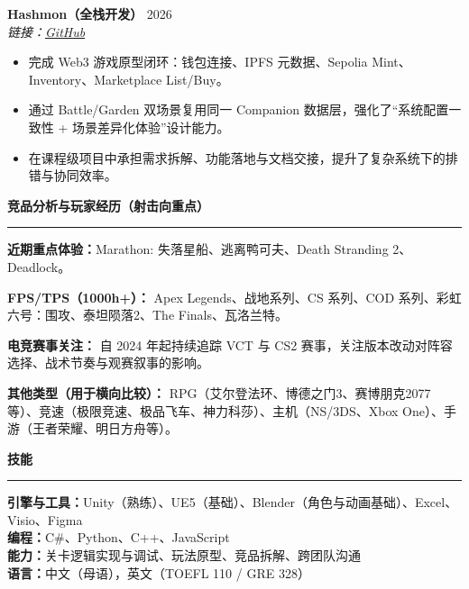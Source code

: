 \documentclass[11pt,a4paper]{ctexart}
\newcommand{\head}[1]{\vspace{2pt}\textbf{\large #1}\vspace{2pt}\hrule\vspace{4pt}}
\begin{document}
\textbf{Hashmon（全栈开发）} \hfill 2026\\
\textit{链接：\href{https://github.com/Hidden61ade/Hashmon}{GitHub}}\\
\begin{itemize}[leftmargin=1.3em,itemsep=2pt,topsep=2pt]
  \item 完成 Web3 游戏原型闭环：钱包连接、IPFS 元数据、Sepolia Mint、Inventory、Marketplace List/Buy。
  \item 通过 Battle/Garden 双场景复用同一 Companion 数据层，强化了“系统配置一致性 + 场景差异化体验”设计能力。
  \item 在课程级项目中承担需求拆解、功能落地与文档交接，提升了复杂系统下的排错与协同效率。
\end{itemize}

\head{竞品分析与玩家经历（射击向重点）}
\textbf{近期重点体验：}Marathon: 失落星船、逃离鸭可夫、Death Stranding 2、Deadlock。

\textbf{FPS/TPS（1000h+）：}
Apex Legends、战地系列、CS 系列、COD 系列、彩虹六号：围攻、泰坦陨落2、The Finals、瓦洛兰特。

\textbf{电竞赛事关注：}
自 2024 年起持续追踪 VCT 与 CS2 赛事，关注版本改动对阵容选择、战术节奏与观赛叙事的影响。

\textbf{其他类型（用于横向比较）：}
RPG（艾尔登法环、博德之门3、赛博朋克2077 等）、竞速（极限竞速、极品飞车、神力科莎）、主机（NS/3DS、Xbox One）、手游（王者荣耀、明日方舟等）。

\head{技能}
\textbf{引擎与工具：}Unity（熟练）、UE5（基础）、Blender（角色与动画基础）、Excel、Visio、Figma\\
\textbf{编程：}C\#、Python、C++、JavaScript\\
\textbf{能力：}关卡逻辑实现与调试、玩法原型、竞品拆解、跨团队沟通\\
\textbf{语言：}中文（母语），英文（TOEFL 110 / GRE 328）
\end{document}
